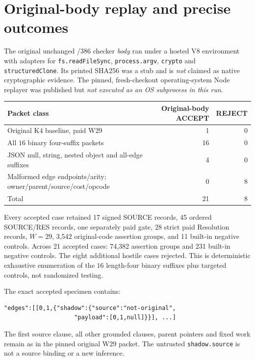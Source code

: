 \documentclass[11pt]{article}
\begin{document}
\section*{Original-body replay and precise outcomes}
The original unchanged /386 checker \emph{body} ran under a hosted V8 environment with adapters for \texttt{fs.readFileSync}, \texttt{process.argv}, \texttt{crypto} and \texttt{structuredClone}. Its printed SHA256 was a stub and is \emph{not} claimed as native cryptographic evidence. The pinned, fresh-checkout operating-system Node replayer was published but \emph{not executed as an OS subprocess in this run}.
\begin{center}
\begin{tabular}{lrr}
\toprule
Packet class & Original-body ACCEPT & REJECT\\
\midrule
Original K4 baseline, paid W29 &1&0\\
All $16$ binary four-suffix packets &16&0\\
JSON null, string, nested object and all-edge suffixes &4&0\\
Malformed edge endpoints/arity; owner/parent/source/cost/opcode &0&8\\
\midrule
Total &21&8\\
\bottomrule
\end{tabular}
\end{center}
Every accepted case retained 17 signed SOURCE records, 45 ordered SOURCE/RES records, one separately paid gate, 28 strict paid Resolution records, $W=29$, 3,542 original-code assertion groups, and 11 built-in negative controls. Across 21 accepted cases: 74,382 assertion groups and 231 built-in negative controls. The eight additional hostile cases rejected. This is deterministic exhaustive enumeration of the $16$ length-four binary suffixes plus targeted controls, not randomized testing.

The exact accepted specimen contains:
\begin{verbatim}
"edges":[[0,1,{"shadow":{"source":"not-original",
                    "payload":[0,1,null]}}], ...]
\end{verbatim}
The first source clause, all other grounded clauses, parent pointers and fixed work remain as in the pinned original W29 packet. The untrusted \texttt{shadow.source} is not a source binding or a new inference.
\end{document}
